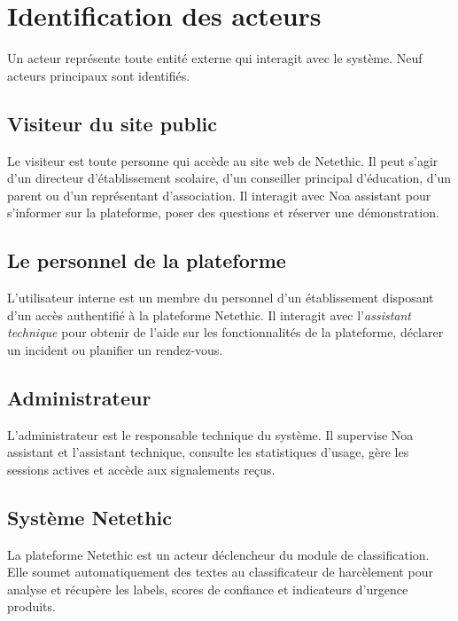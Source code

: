 \section{Identification des acteurs}

Un acteur représente toute entité externe qui interagit avec le système.
Neuf acteurs principaux sont identifiés.

\subsection{Visiteur du site public}

Le visiteur est toute personne qui accède au site web de Netethic.
Il peut s'agir d'un directeur d'établissement scolaire, d'un conseiller principal d'éducation,
d'un parent ou d'un représentant d'association.
Il interagit avec Noa assistant pour s'informer sur la plateforme, poser des questions
et réserver une démonstration.

\subsection{Le personnel de la plateforme}

L'utilisateur interne est un membre du personnel d'un établissement disposant
d'un accès authentifié à la plateforme Netethic.
Il interagit avec l'\textit{assistant technique} pour obtenir de l'aide sur
les fonctionnalités de la plateforme, déclarer un incident ou planifier un rendez-vous.

\subsection{Administrateur}

L'administrateur est le responsable technique du système.
Il supervise Noa assistant et l'assistant technique, consulte les statistiques d'usage,
gère les sessions actives et accède aux signalements reçus.

\subsection{Système Netethic}

La plateforme Netethic est un acteur déclencheur du module de classification.
Elle soumet automatiquement des textes au classificateur de harcèlement pour analyse
et récupère les labels, scores de confiance et indicateurs d'urgence produits.

